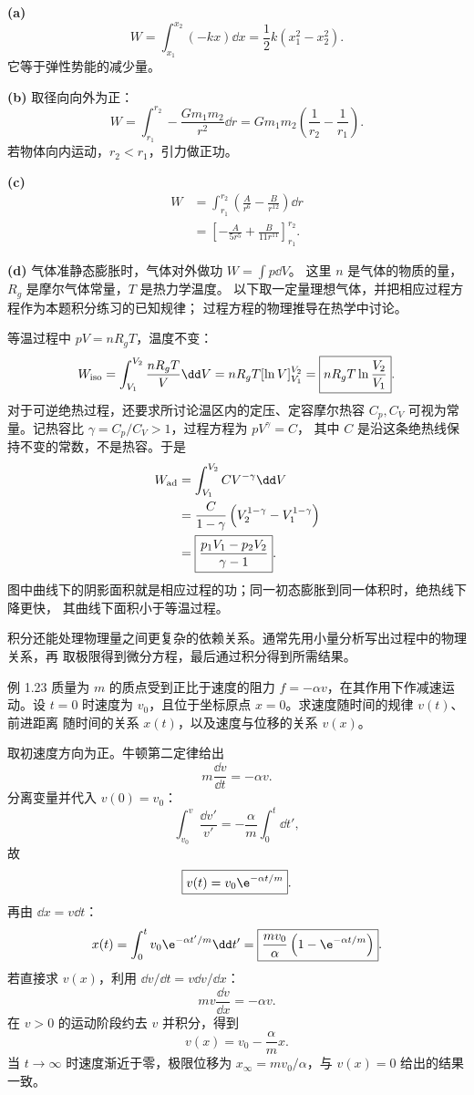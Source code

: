 \begin{xesolution}
\textbf{(a)}
\[
 W=\int_{x_1}^{x_2}(-kx)\dd x
 =\boxed{\frac12k(x_1^2-x_2^2)}.
\]
它等于弹性势能的减少量。

\textbf{(b)} 取径向向外为正：
\[
 W=\int_{r_1}^{r_2}-\frac{Gm_1m_2}{r^2}\dd r
 =\boxed{Gm_1m_2\left(\frac1{r_2}-\frac1{r_1}\right)}.
\]
若物体向内运动，$r_2<r_1$，引力做正功。

\textbf{(c)}
\begin{align*}
 W&=\int_{r_1}^{r_2}\left(\frac A{r^6}-\frac B{r^{12}}\right)\dd r\\
 &=\boxed{\left[-\frac{A}{5r^5}+\frac{B}{11r^{11}}\right]_{r_1}^{r_2}}.
\end{align*}

\textbf{(d)} 气体准静态膨胀时，气体对外做功 $W=\int p\dd V$。
这里 $n$ 是气体的物质的量，$R_g$ 是摩尔气体常量，$T$ 是热力学温度。
以下取一定量理想气体，并把相应过程方程作为本题积分练习的已知规律；
过程方程的物理推导在热学中讨论。

等温过程中 $pV=nR_gT$，温度不变：
\[
 W_{\rm iso}=\int_{V_1}^{V_2}\frac{nR_gT}{V}\dd V
 =nR_gT[\ln V]_{V_1}^{V_2}
 =\boxed{nR_gT\ln\frac{V_2}{V_1}}.
\]
对于可逆绝热过程，还要求所讨论温区内的定压、定容摩尔热容 $C_p,C_V$
可视为常量。记热容比 $\gamma=C_p/C_V>1$，过程方程为 $pV^\gamma=C$，
其中 $C$ 是沿这条绝热线保持不变的常数，不是热容。于是
\begin{align*}
 W_{\rm ad}
 &=\int_{V_1}^{V_2}CV^{-\gamma}\dd V\\
 &=\frac{C}{1-\gamma}
   \left(V_2^{1-\gamma}-V_1^{1-\gamma}\right)\\
 &=\boxed{\frac{p_1V_1-p_2V_2}{\gamma-1}}.
\end{align*}
图中曲线下的阴影面积就是相应过程的功；同一初态膨胀到同一体积时，绝热线下降更快，
其曲线下面积小于等温过程。
\end{xesolution}

积分还能处理物理量之间更复杂的依赖关系。通常先用小量分析写出过程中的物理关系，再
取极限得到微分方程，最后通过积分得到所需结果。

\begin{origexamplebox}{例 1.23}
质量为 $m$ 的质点受到正比于速度的阻力 $f=-\alpha v$，在其作用下作减速运动。设
$t=0$ 时速度为 $v_0$，且位于坐标原点 $x=0$。求速度随时间的规律 $v(t)$、前进距离
随时间的关系 $x(t)$，以及速度与位移的关系 $v(x)$。
\end{origexamplebox}

\begin{xesolution}
取初速度方向为正。牛顿第二定律给出
\[
 m\frac{\dd v}{\dd t}=-\alpha v.
\]
分离变量并代入 $v(0)=v_0$：
\[
 \int_{v_0}^{v}\frac{\dd v'}{v'}
 =-\frac\alpha m\int_0^t\dd t',
\]
故
\[
 \boxed{v(t)=v_0\e^{-\alpha t/m}}.
\]
再由 $\dd x=v\dd t$：
\[
 x(t)=\int_0^tv_0\e^{-\alpha t'/m}\dd t'
 =\boxed{\frac{mv_0}{\alpha}
 \left(1-\e^{-\alpha t/m}\right)}.
\]
若直接求 $v(x)$，利用 $\dd v/\dd t=v\dd v/\dd x$：
\[
 mv\frac{\dd v}{\dd x}=-\alpha v.
\]
在 $v>0$ 的运动阶段约去 $v$ 并积分，得到
\[
 \boxed{v(x)=v_0-\frac\alpha m x}.
\]
当 $t\to\infty$ 时速度渐近于零，极限位移为
$x_\infty=mv_0/\alpha$，与 $v(x)=0$ 给出的结果一致。
\end{xesolution}

